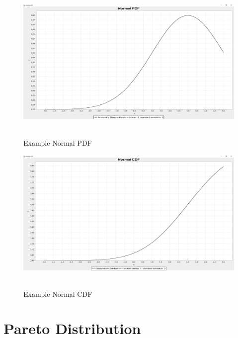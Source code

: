 		\begin{figure}[H]
			\centering
			\includegraphics[width=1\textwidth]{Figures/implemented_functions/normal_pdf}~\\
			\caption{Example Normal PDF}
			\label{fig:normal_pdf}
		\end{figure}


		\begin{figure}[H]
			\centering
			\includegraphics[width=1\textwidth]{Figures/implemented_functions/normal_cdf}~\\
			\caption{Example Normal CDF}
			\label{fig:normal_cdf}
		\end{figure}

		
	\section{Pareto Distribution}
	
